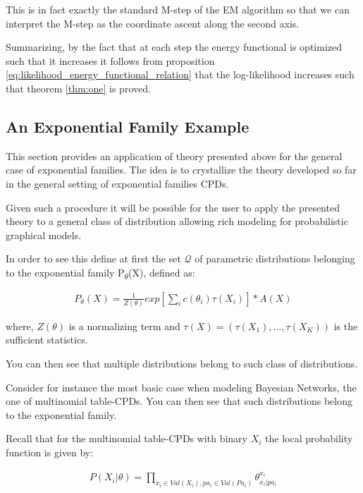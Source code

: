 \documentclass[11pt]{article}
\begin{document}
\begin{article}
This is in fact exactly the standard M-step of the EM algorithm so
that we can interpret the M-step as the coordinate ascent along
the second axis. 

Summarizing, by the fact that at each step the energy functional is
optimized such that it increases it follows from proposition
\ref{eq:likelihood_energy_functional_relation} that the
log-likelihood increases such that theorem \ref{thm:one} is proved.

\subsection{An Exponential Family Example}
\label{sec:orgf655205}

This section provides an application of theory presented above for
the general case of exponential families. The idea is to
crystallize the theory developed so far in the general setting of
exponential families CPDs.

Given such a procedure it will be possible for the user to apply
the presented theory to a general class of distribution allowing
rich modeling for probabilistic graphical models.

In order to see this define at first the set \(\mathscr{Q}\) of
parametric distributions belonging to the exponential family
P\textsubscript{\(\theta\)}(X), defined as:

\begin{align} \label{eq:exponential-family}
P_{\theta}(X) = \frac{1}{Z(\theta)} exp[\sum_i c(\theta_i)\tau(X_i)] * A(X)
\end{align}

where, \(Z(\theta)\) is a normalizing term and \(\tau(X) = (\tau(X_1),
    ..., \tau(X_K))\) is the sufficient statistics.

You can then see that multiple distributions belong to such class
of distributions.

Consider for instance the most basic case when modeling Bayesian
Networks, the one of multinomial table-CPDs. You can then see that
such distributions belong to the exponential family.

Recall that for the multinomial table-CPDs with binary \(X_i\) the
local probability function is given by:

\begin{align} \label{eq:multinomial-cpd}
P(X_i|\theta) = \prod_{x_i \in Val(X_i), pa_i \in Val(Pa_i)} \theta_{x_i | pa_i}^{x_i}
\end{align}


\end{article}
\end{document}
